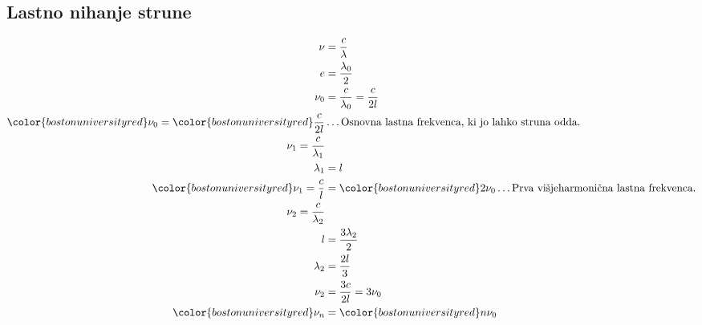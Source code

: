 {\color{indiagreen}\subsection{Lastno nihanje strune}}
\begin{align*}
	\nu &= \frac{c}{\lambda}\\
	e &= \frac{\lambda_0}{2}\\
	\nu_0 &= \frac{c}{\lambda_0} = \frac{c}{2l}\\
	{\color{bostonuniversityred}\nu_0} = {\color{bostonuniversityred}\frac{c}{2l}} &\dots \text{Osnovna lastna frekvenca, ki jo lahko struna odda.}\\
	\nu_1 = \frac{c}{\lambda_1}\\
	\lambda_1 &= l\\
	{\color{bostonuniversityred}\nu_1 = \frac{c}{l}} &= {\color{bostonuniversityred}2\nu_0} \dots \text{Prva višjeharmonična lastna frekvenca.}\\
	\nu_2 = \frac{c}{\lambda_2}\\
	l &= \frac{3\lambda_2}{2}\\
	\lambda_2 &= \frac{2l}{3}\\
	\nu_2 &= \frac{3c}{2l} = 3\nu_0\\
	{\color{bostonuniversityred}\nu_n} &= {\color{bostonuniversityred}n\nu_0}\\
\end{align*}